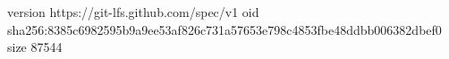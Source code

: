 version https://git-lfs.github.com/spec/v1
oid sha256:8385c6982595b9a9ee53af826c731a57653e798c4853fbe48ddbb006382dbef0
size 87544
